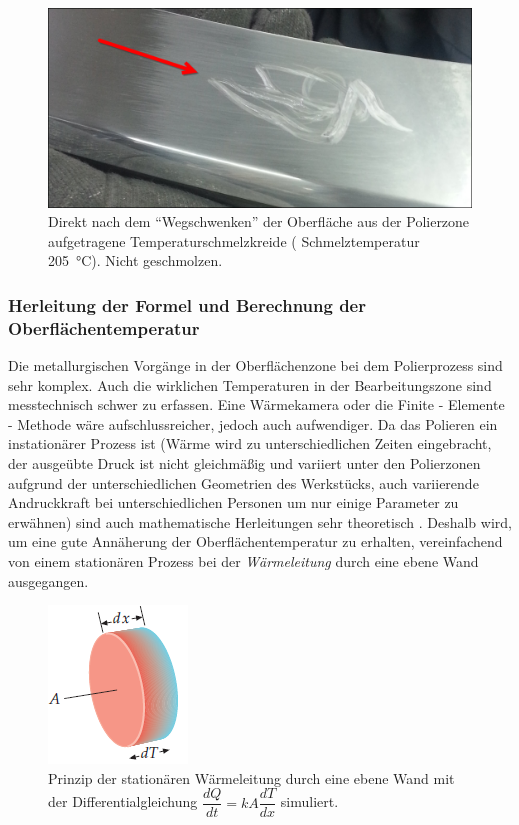 \documentclass[12pt,a4paper,parskip,twoside,BCOR5mm,headsepline]{scrartcl}
\begin{document}
\begin{figure}[H]
\centering
\includegraphics[width=.8\textwidth]{Kreide}
\caption{Direkt nach dem "`Wegschwenken"' der Oberfläche aus der Polierzone aufgetragene Temperaturschmelzkreide ( Schmelztemperatur \SI{205}{\degreeCelsius}). Nicht geschmolzen.}
\label{kreide}
\end{figure}









\subsubsection{Herleitung der Formel und Berechnung der Oberflächentemperatur}
Die metallurgischen Vorgänge in der Oberflächenzone bei dem Polierprozess sind sehr komplex. Auch die wirklichen Temperaturen in der Bearbeitungszone sind messtechnisch schwer zu erfassen. Eine Wärmekamera oder die Finite - Elemente - Methode wäre aufschlussreicher, jedoch auch aufwendiger. Da das Polieren ein instationärer Prozess ist (Wärme wird zu unterschiedlichen Zeiten eingebracht, der ausgeübte Druck ist nicht gleichmäßig und variiert unter den Polierzonen aufgrund der unterschiedlichen Geometrien des Werkstücks, auch variierende Andruckkraft bei unterschiedlichen Personen um nur einige Parameter zu erwähnen) sind auch mathematische Herleitungen sehr theoretisch . Deshalb wird, um eine gute Annäherung der Oberflächentemperatur zu erhalten, vereinfachend von einem stationären Prozess bei der \emph{Wärmeleitung} durch eine ebene Wand ausgegangen.




\begin{figure}[H]
\centering
\includegraphics[width=.4\textwidth]{warmleittip}
\caption{Prinzip der stationären Wärmeleitung durch eine ebene Wand mit der Differentialgleichung $ \dfrac{dQ}{dt} = kA \dfrac{dT}{dx} $ simuliert. \autocite[675]{phtip}}
\label{tipler}
\end{figure}  
\end{document}

